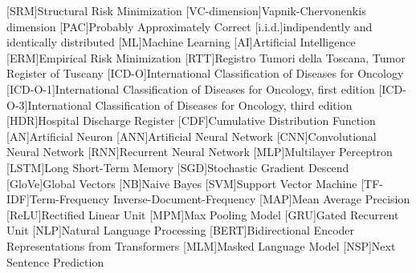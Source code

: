 

\newcommand{\svm}{\textbf{\emph{T-SVM}}}
\newcommand{\svmb}{\textbf{\emph{T2-SVM}}}
\newcommand{\lstmng}{\textbf{\emph{T2-2LSTM}}}
\newcommand{\lstmc}{\textbf{\emph{G-CLSTM}}}
\newcommand{\lstmb}{\textbf{\emph{G-2LSTM}}}

\newcommand{\site}{Main-site}
\newcommand{\fullSite}{Full-site}
\newcommand{\type}{Type}
\newcommand{\behaviour}{Behavior}

\newcommand{\matr}[1]{\bm{#1}}
\newcommand{\vect}[1]{\bm{#1}}
\newcommand{\dist}[1]{\mathcal{#1}}

\newtheorem{definition}{Definition}[section]
\newtheorem{lemma}[definition]{Lemma}
\newtheorem{corollary}[definition]{Corollary}
\newtheorem{theorem}[definition]{Theorem}

\def\RSet{\mathbb{R}}
\def\NSet{\mathbb{N}}
\def\XSet{\mathbb{X}}
\def\YSet{\mathbb{Y}}
\def\HSet{\mathbb{H}}
\def\prob{\mathbb{P}}
\def\expect{\mathbb{E}}
\def\define{\overset{\underset{\mathrm{def}}{}}{=}}

\DeclareMathOperator*{\argmax}{arg\,max}
\DeclareMathOperator*{\argmin}{arg\,min}

\def\MAX{MPM}
\def\loss{\mathcal{L}}

\def\maxi{MPMi}
\def\maxb{MPMb}


[SRM]{Structural Risk Minimization}
[VC-dimension]{Vapnik-Chervonenkis dimension}
[PAC]{Probably Approximately Correct}
[i.i.d.]{indipendently and identically distributed}
[ML]{Machine Learning}
[AI]{Artificial Intelligence}
[ERM]{Empirical Risk Minimization}
[RTT]{Registro Tumori della Toscana, Tumor Register of Tuscany}
[ICD-O]{International Classification of Diseases for Oncology}
[ICD-O-1]{International Classification of Diseases for Oncology, first edition}
[ICD-O-3]{International Classification of Diseases for Oncology, third edition}
[HDR]{Hospital Discharge Register}
[CDF]{Cumulative Distribution Function}
[AN]{Artificial Neuron}
[ANN]{Artificial Neural Network}
[CNN]{Convolutional Neural Network}
[RNN]{Recurrent Neural Network}
[MLP]{Multilayer Perceptron}
[LSTM]{Long Short-Term Memory}
[SGD]{Stochastic Gradient Descend}
[GloVe]{Global Vectors}
[NB]{Naive Bayes}
[SVM]{Support Vector Machine}
[TF-IDF]{Term-Frequency Inverse-Document-Frequency}
[MAP]{Mean Average Precision}
[ReLU]{Rectified Linear Unit}
[MPM]{Max Pooling Model}
[GRU]{Gated Recurrent Unit}
[NLP]{Natural Language Processing}
[BERT]{Bidirectional Encoder Representations from Transformers}
[MLM]{Masked Language Model}
[NSP]{Next Sentence Prediction}

